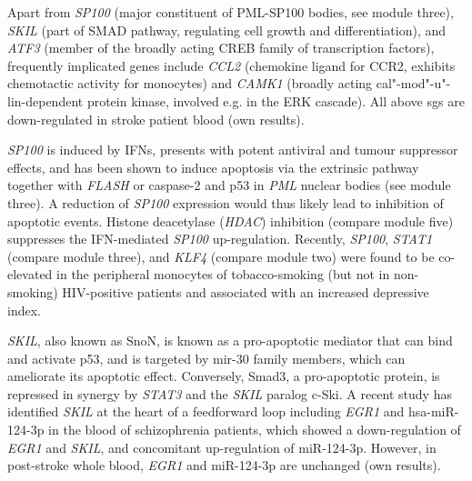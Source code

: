 Apart from \emph{SP100} (major constituent of PML-SP100 bodies, see module three), \emph{SKIL} (part of SMAD pathway, regulating cell growth and differentiation), and \emph{ATF3} (member of the broadly acting CREB family of transcription factors), frequently implicated genes include \emph{CCL2} (chemokine ligand for CCR2, exhibits chemotactic activity for monocytes\cite{Zhang1994}) and \emph{CAMK1} (broadly acting cal"-mod"-u"-lin-dependent protein kinase, involved e.g. in the ERK cascade). All above \acp{sg} are down-regulated in stroke patient blood (own results).

\emph{SP100} is induced by IFNs, presents with potent antiviral and tumour suppressor effects, and has been shown to induce apoptosis via the extrinsic pathway together with \emph{FLASH} or caspase-2 and p53 in \emph{PML} nuclear bodies (see module three).\cite{Sanchez-Pulido2007} A reduction of \emph{SP100} expression would thus likely lead to inhibition of apoptotic events. Histone deacetylase (\emph{HDAC}) inhibition (compare module five) suppresses the IFN-mediated \emph{SP100} up-regulation.\cite{Vlasakova2007} Recently, \emph{SP100}, \emph{STAT1} (compare module three), and \emph{KLF4} (compare module two) were found to be co-elevated in the peripheral monocytes of tobacco-smoking (but not in non-smoking) HIV-positive patients and associated with an increased depressive index.\cite{Lorenz2019}

\emph{SKIL}, also known as SnoN, is known as a pro-apoptotic mediator that can bind and activate p53, and is targeted by mir-30 family members, which can ameliorate its apoptotic effect.\cite{Kim2018} Conversely, Smad3, a pro-apoptotic protein, is repressed in synergy by \emph{STAT3} and the \emph{SKIL} paralog c-Ski.\cite{Makino2017} A recent study has identified \emph{SKIL} at the heart of a feedforward loop including \emph{EGR1} and hsa-miR-124-3p in the blood of schizophrenia patients, which showed a down-regulation of \emph{EGR1} and \emph{SKIL}, and concomitant up-regulation of miR-124-3p.\cite{Xu2016} However, in post-stroke whole blood, \emph{EGR1} and miR-124-3p are unchanged (own results).

